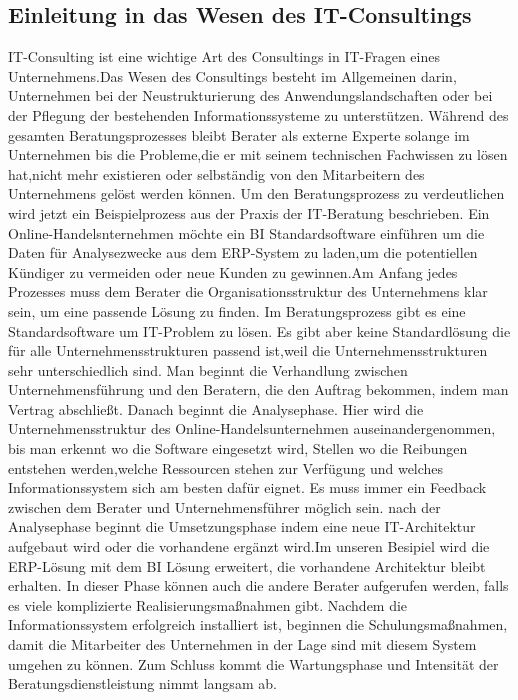 \subsection{Einleitung in das Wesen des IT-Consultings}	

IT-Consulting ist eine wichtige Art des Consultings in IT-Fragen eines Unternehmens.Das Wesen des Consultings besteht im Allgemeinen darin, Unternehmen bei der Neustrukturierung des Anwendungslandschaften oder bei der Pflegung der bestehenden Informationssysteme zu unterstützen. Während des gesamten Beratungsprozesses bleibt Berater als externe Experte solange im Unternehmen bis die Probleme,die er mit seinem technischen Fachwissen zu lösen hat,nicht mehr existieren oder selbständig von den Mitarbeitern des Unternehmens gelöst werden können.
Um den Beratungsprozess zu verdeutlichen wird jetzt ein Beispielprozess aus der Praxis der IT-Beratung beschrieben. Ein Online-Handelsnternehmen möchte ein BI Standardsoftware einführen um die Daten für Analysezwecke aus dem ERP-System zu laden,um die potentiellen Kündiger zu vermeiden oder neue Kunden zu gewinnen.Am Anfang jedes Prozesses muss dem Berater die Organisationsstruktur des Unternehmens klar sein, um eine passende Lösung zu finden. Im Beratungsprozess gibt es eine Standardsoftware um IT-Problem zu lösen. Es gibt aber keine Standardlösung die für alle Unternehmensstrukturen passend ist,weil die Unternehmensstrukturen sehr unterschiedlich sind. Man beginnt die Verhandlung zwischen Unternehmensführung und den Beratern, die den Auftrag bekommen, indem man Vertrag abschließt. Danach beginnt die Analysephase. Hier wird die Unternehmensstruktur des Online-Handelsunternehmen auseinandergenommen, bis man erkennt wo die Software eingesetzt wird, Stellen wo die Reibungen entstehen werden,welche Ressourcen stehen zur Verfügung und welches Informationssystem sich am besten dafür eignet.
Es muss immer ein Feedback zwischen dem Berater und Unternehmensführer möglich sein.
nach der Analysephase beginnt die Umsetzungsphase indem eine neue IT-Architektur aufgebaut wird oder die vorhandene ergänzt wird.Im unseren Besipiel wird die ERP-Lösung mit dem BI Lösung erweitert, die vorhandene Architektur bleibt erhalten. In dieser Phase können auch die andere Berater aufgerufen werden, falls es viele komplizierte Realisierungsmaßnahmen gibt.
Nachdem die Informationssystem erfolgreich installiert ist, beginnen die Schulungsmaßnahmen, damit die Mitarbeiter des Unternehmen in der Lage sind mit diesem System umgehen zu können. Zum Schluss kommt die Wartungsphase und Intensität der Beratungsdienstleistung nimmt langsam ab. 
